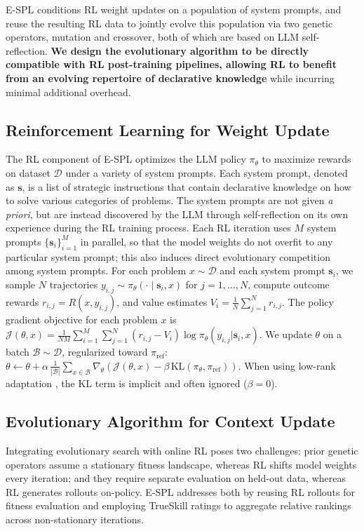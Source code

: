 \documentclass{article}
\theoremstyle{plain}
\theoremstyle{definition}
\theoremstyle{remark}
\begin{document}
E-SPL conditions RL weight updates on a population of system prompts, and reuse the resulting RL data to jointly evolve this population via two genetic operators, mutation and crossover, both of which are based on LLM self-reflection.
\textbf{We design the evolutionary algorithm to be directly compatible with RL post-training pipelines, allowing RL to benefit from an evolving repertoire of declarative knowledge} while incurring minimal additional overhead.

\vspace{-5pt}
\subsection{Reinforcement Learning for Weight Update}
The RL component of E-SPL optimizes the LLM policy $\pi_{\theta}$ to maximize rewards on dataset $\mathcal{D}$ under a variety of system prompts. Each system prompt, denoted as $\mathbf{s}$, is a list of strategic instructions that contain declarative knowledge on how to solve various categories of problems. The system prompts are not given \textit{a priori}, but are instead discovered by the LLM through self-reflection on its own experience during the RL training process. Each RL iteration uses $M$ system prompts $\{\mathbf{s}_{i}\}_{i=1}^{M}$ in parallel, so that the model weights do not overfit to any particular system prompt; this also induces direct evolutionary competition among system prompts.
For each problem $x\sim \mathcal{D}$ and each system prompt $\mathbf{s}_{i}$, we sample $N$ trajectories $y_{i,j}\sim \pi_{\theta}(\cdot \mid \mathbf{s}_{i}, x)$ for $j=1,\dots,N$, compute outcome rewards $r_{i,j} = R(x,y_{i,j})$, and value estimates $V_{i} = \frac{1}{N} \sum_{j=1}^{N} r_{i,j}$\label{eq:value-function-def}.
The policy gradient objective for each problem $x$ is $\mathcal{J}(\theta, x) = {\textstyle\frac{1}{NM}} {\textstyle\sum_{i=1}^{M}} {\textstyle\sum}_{j=1}^{N} ( r_{i,j} - V_{i} ) \log \pi_{\theta}( y_{i,j}| \mathbf{s}_{i}, x)$.
We update $\theta$ on a batch $\mathcal{B} \sim \mathcal{D}$, regularized toward $\pi_{\text{ref}}$: $\theta \leftarrow \theta + \alpha \, {\textstyle\frac{1}{ |\mathcal{B}| }} {\sum}_{x \in \mathcal{B}} \nabla_{\theta} (\mathcal{J}(\theta, x) - \beta \, \mathrm{KL}( \pi_{\theta}, \pi_{\text{ref}}))$.
When using low-rank adaptation \citep{lora}, the KL term is implicit and often ignored ($\beta=0$).

\vspace{-5pt}
\subsection{Evolutionary Algorithm for Context Update}
Integrating evolutionary search with online RL poses two challenges: prior genetic operators assume a stationary fitness landscape, whereas RL shifts model weights every iteration; and they require separate evaluation on held-out data, whereas RL generates rollouts on-policy. E-SPL addresses both by reusing RL rollouts for fitness evaluation and employing TrueSkill ratings to aggregate relative rankings across non-stationary iterations.
\end{document}
